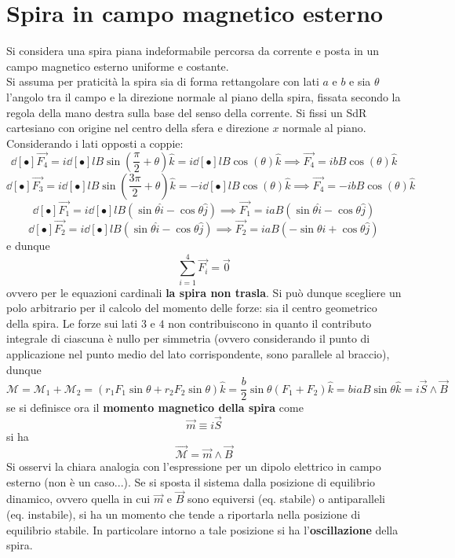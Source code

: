 \section{Spira in campo magnetico esterno}
Si considera una spira piana indeformabile percorsa da corrente e posta in un campo magnetico esterno uniforme e costante.
\\Si assuma per praticità la spira sia di forma rettangolare con lati $a$ e $b$ e sia $\theta$ l'angolo tra il campo e la direzione normale al piano della spira, fissata secondo la regola della mano destra sulla base del senso della corrente. Si fissi un SdR cartesiano con origine nel centro della sfera e direzione $x$ normale al piano.
\\Considerando i lati opposti a coppie:
\[\dd[•]{\vec{F_4}} = i \dd[•]{l} B \sin(\frac{\pi}{2} + \theta) \hat{k} = i \dd[•]{l} B \cos(\theta) \hat{k} \implies \vec{F_4} = i b B \cos(\theta) \hat{k}\]
\[\dd[•]{\vec{F_3}} = i \dd[•]{l} B \sin(\frac{3\pi}{2} + \theta) \hat{k} = - i \dd[•]{l} B \cos(\theta) \hat{k} \implies \vec{F_4} = - i b B \cos(\theta) \hat{k}\]
\[\dd[•]{\vec{F_1}} = i \dd[•]{l} B (\sin\theta \hat{i} - \cos \theta \hat{j}) \implies \vec{F_1} = i a B (\sin\theta \hat{i} - \cos \theta \hat{j})\]
\[\dd[•]{\vec{F_2}} = i \dd[•]{l} B (\sin\theta \hat{i} - \cos \theta \hat{j}) \implies \vec{F_2} = i a B (- \sin\theta \hat{i} + \cos \theta \hat{j})\]
e dunque
\[\sum\limits_{i=1}^{4} \vec{F_i} = \vec{0}\]
ovvero per le equazioni cardinali \textbf{la spira non trasla}. Si può dunque scegliere un polo arbitrario per il calcolo del momento delle forze: sia il centro geometrico della spira. Le forze sui lati $3$ e $4$ non contribuiscono in quanto il contributo integrale di ciascuna è nullo per simmetria (ovvero considerando il punto di applicazione nel punto medio del lato corrispondente, sono parallele al braccio), dunque
\[\mathcal{M} = \mathcal{M}_1 + \mathcal{M}_2 = (r_1 F_1 \sin \theta + r_2 F_2 \sin \theta)\hat{k} = \frac{b}{2} \sin \theta (F_1 + F_2) \hat{k} = b i a B \sin \theta \hat{k} = i \vec{S} \wedge \vec{B}\]
se si definisce ora il \textbf{momento magnetico della spira} come
\[\vec{m} \equiv i \vec{S}\]
si ha
\[\vec{\mathcal{M}} = \vec{m} \wedge \vec{B}\]
Si osservi la chiara analogia con l'espressione per un dipolo elettrico in campo esterno (non è un caso...). Se si sposta il sistema dalla posizione di equilibrio dinamico, ovvero quella in cui $\vec{m}$ e $\vec{B}$ sono equiversi (eq. stabile) o antiparalleli (eq. instabile), si ha un momento che tende a riportarla nella posizione di equilibrio stabile. In particolare intorno a tale posizione si ha l'\textbf{oscillazione} della spira. 
